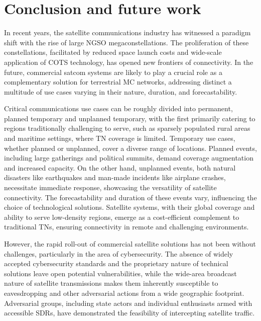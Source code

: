 \documentclass[english, 12pt, a4paper, elec, utf8, a-1b, online]{aaltothesis}
\begin{document}
\clearpage

\section{Conclusion and future work}

In recent years, the satellite communications industry has witnessed a paradigm shift with the rise of large NGSO megaconstellations.
The proliferation of these constellations, facilitated by reduced space launch costs and wide-scale application of COTS technology, has opened new frontiers of connectivity.
In the future, commercial satcom systems are likely to play a crucial role as a complementary solution for terrestrial MC networks, addressing distinct a multitude of use cases varying in their nature, duration, and forecastability.

Critical communications use cases can be roughly divided into permanent, planned temporary and unplanned temporary, with the first primarily catering to regions traditionally challenging to serve, such as sparsely populated rural areas and maritime settings, where TN coverage is limited. Temporary use cases, whether planned or unplanned, cover a diverse range of locations. Planned events, including large gatherings and political summits, demand coverage augmentation and increased capacity. On the other hand, unplanned events, both natural disasters like earthquakes and man-made incidents like airplane crashes, necessitate immediate response, showcasing the versatility of satellite connectivity. The forecastability and duration of these events vary, influencing the choice of technological solutions. Satellite systems, with their global coverage and ability to serve low-density regions, emerge as a cost-efficient complement to traditional TNs, ensuring connectivity in remote and challenging environments.

However, the rapid roll-out of commercial satellite solutions has not been without challenges, particularly in the area of cybersecurity.
The absence of widely accepted cybersecurity standards and the proprietary nature of technical solutions leave open potential vulnerabilities, while the wide-area broadcast nature of satellite transmissions makes them inherently susceptible to eavesdropping and other adversarial actions from a wide geographic footprint.
Adversarial groups, including state actors and individual enthusiasts armed with accessible SDRs, have demonstrated the feasibility of intercepting satellite traffic.
\end{document}
